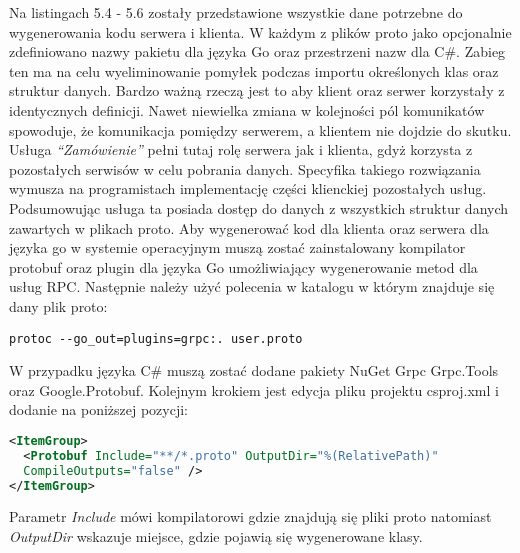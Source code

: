 \par Na listingach 5.4 - 5.6 zostały przedstawione wszystkie dane potrzebne do wygenerowania kodu serwera i klienta.
W każdym z plików proto jako opcjonalnie zdefiniowano nazwy pakietu dla języka Go oraz przestrzeni nazw dla C\#. Zabieg ten ma na celu wyeliminowanie pomyłek podczas importu określonych klas oraz struktur danych.
 Bardzo ważną rzeczą jest to aby klient oraz serwer korzystały z identycznych definicji. Nawet niewielka zmiana w kolejności pól komunikatów spowoduje, że komunikacja pomiędzy serwerem, a klientem nie dojdzie do skutku. Usługa \textit{\enquote{Zamówienie}} pełni tutaj rolę serwera jak i klienta, gdyż korzysta z pozostałych serwisów w celu pobrania danych. Specyfika takiego rozwiązania wymusza na programistach implementację części klienckiej pozostałych usług. Podsumowując usługa ta posiada dostęp do danych z wszystkich struktur danych zawartych w plikach proto. Aby wygenerować kod dla klienta oraz serwera dla języka go w systemie operacyjnym muszą zostać zainstalowany kompilator protobuf oraz plugin dla języka Go umożliwiający wygenerowanie metod dla usług RPC. Następnie należy użyć polecenia w katalogu w którym znajduje się dany plik proto:
\begin{center}
    \begin{lstlisting}[caption=Polecenie do generowania kodu z plików proto dla języka Go]
        protoc --go_out=plugins=grpc:. user.proto
    \end{lstlisting}
\end{center}
W przypadku języka C\# muszą zostać dodane pakiety NuGet Grpc Grpc.Tools oraz Google.Protobuf. Kolejnym krokiem jest edycja pliku projektu csproj.xml i dodanie na poniższej pozycji:
\begin{lstlisting}[language=xml, caption=Modyfikacjie pliku projektu net core]
<ItemGroup>
  <Protobuf Include="**/*.proto" OutputDir="%(RelativePath)" 
  CompileOutputs="false" />
</ItemGroup>
\end{lstlisting}
Parametr \textit{Include} mówi kompilatorowi gdzie znajdują się pliki proto natomiast \textit{OutputDir} wskazuje miejsce, gdzie pojawią się wygenerowane klasy.

